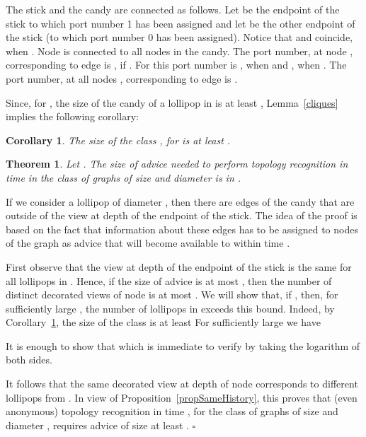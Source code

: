\documentclass{article}
\newcommand*{\qed}{\hfill\ensuremath{\square}}
\newtheorem{theorem}{Theorem}[section]
\newtheorem{corollary}{Corollary}[section]
\newenvironment{proof}{\noindent{\bf Proof:}}{\qed}
\begin{document}
The stick and the candy are connected as follows.
Let  be the endpoint of the stick to which port number 1 has been assigned and let  be the other endpoint of the stick (to which port number 0 has been assigned). Notice that  and  coincide, when .
Node  is connected to all nodes in the candy. The port number, at node , corresponding to edge   is , if . For  this port number is , when  and , when . The port number, at all nodes , corresponding to edge  is .


Since, for , the size of the candy of a lollipop in  is at least , Lemma~\ref{cliques} implies the following corollary:


\begin{corollary}\label{corLollipops}
The size of the class , for  is at least {.}
\end{corollary}

\begin{theorem}\label{lbD}
Let .
The size of advice needed to perform topology recognition in time  in the class of graphs of size  and diameter 
is in .
\end{theorem}
\begin{proof}
If we consider a lollipop of diameter , then there are  edges of the candy that are outside of the view at depth  of the endpoint  of the stick. 
The idea of the proof is based on the fact that  information about these edges has to be assigned to nodes of the graph as advice that will become available to  within time .


First observe that the view at depth  of the endpoint  of the stick is the same for all lollipops in .
Hence, if the size of advice is at most , then the number of distinct decorated views of node  is at most .
We will show that, if {,}
then, for sufficiently large , the number of lollipops in  exceeds this bound.
Indeed,  by Corollary~\ref{corLollipops}, the size of the class  is at least
{}
For sufficiently large  we have
\begin{small} 
{

}
\end{small}
It is enough to show that 
{}
which is immediate to verify by taking the logarithm of both sides.

It follows that the same decorated view at depth  of node  corresponds to different lollipops from . In view of Proposition~\ref{propSameHistory}, this proves that (even anonymous) topology recognition in time , for the class of graphs of size  and diameter , requires advice of size at least 
{.}
\end{proof}
\end{document}
